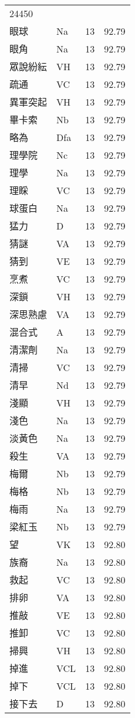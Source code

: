 \documentclass[twocolumn]{book}
\begin{document}
\begin{supertabular}{llrr}
24450\\
眼球 & Na & 13 &  92.79\\
眼角 & Na & 13 &  92.79\\
眾說紛紜 & VH & 13 &  92.79\\
疏通 & VC & 13 &  92.79\\
異軍突起 & VH & 13 &  92.79\\
畢卡索 & Nb & 13 &  92.79\\
略為 & Dfa & 13 &  92.79\\
理學院 & Nc & 13 &  92.79\\
理學 & Na & 13 &  92.79\\
理睬 & VC & 13 &  92.79\\
球蛋白 & Na & 13 &  92.79\\
猛力 & D & 13 &  92.79\\
猜謎 & VA & 13 &  92.79\\
猜到 & VE & 13 &  92.79\\
烹煮 & VC & 13 &  92.79\\
深鎖 & VH & 13 &  92.79\\
深思熟慮 & VA & 13 &  92.79\\
混合式 & A & 13 &  92.79\\
清潔劑 & Na & 13 &  92.79\\
清掃 & VC & 13 &  92.79\\
清早 & Nd & 13 &  92.79\\
淺顯 & VH & 13 &  92.79\\
淺色 & Na & 13 &  92.79\\
淡黃色 & Na & 13 &  92.79\\
殺生 & VA & 13 &  92.79\\
梅爾 & Nb & 13 &  92.79\\
梅格 & Nb & 13 &  92.79\\
梅雨 & Na & 13 &  92.79\\
梁紅玉 & Nb & 13 &  92.79\\
望 & VK & 13 &  92.80\\
族裔 & Na & 13 &  92.80\\
救起 & VC & 13 &  92.80\\
排卵 & VA & 13 &  92.80\\
推敲 & VE & 13 &  92.80\\
推卸 & VC & 13 &  92.80\\
掃興 & VH & 13 &  92.80\\
掉進 & VCL & 13 &  92.80\\
掉下 & VCL & 13 &  92.80\\
接下去 & D & 13 &  92.80\\

\end{supertabular}
\end{document}
